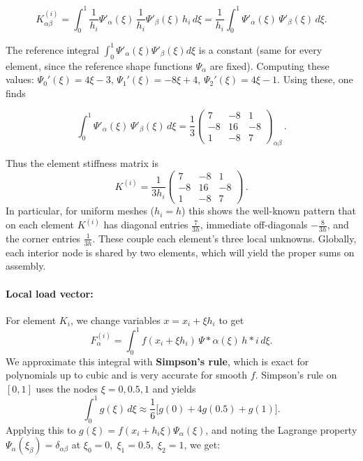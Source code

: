\[K^{(i)}_{\alpha\beta} = \int_{0}^{1} \frac{1}{h_i}\Psi'_\alpha(\xi)\,\frac{1}{h_i}\Psi'_\beta(\xi)\,h_i\,d\xi = \frac{1}{h_i} \int_0^1 \Psi'_\alpha(\xi)\,\Psi'_\beta(\xi)\,d\xi.\]

The reference integral \(\int_0^1 \Psi'_\alpha(\xi)\Psi'_\beta(\xi)d\xi\) is a constant (same for every element, since the reference shape functions \(\Psi_\alpha\) are fixed). Computing these values: \(\Psi_0'(\xi)=4\xi-3\), \(\Psi_1'(\xi)=-8\xi+4\), \(\Psi_2'(\xi)=4\xi-1\).
Using these, one finds

\[
	\int_0^1 \Psi'_\alpha(\xi)\,\Psi'_\beta(\xi)\,d\xi =
	\frac{1}{3}\begin{pmatrix}
		7 & -8 & 1 \\ -8 & 16 & -8 \\ 1 & -8 & 7
	\end{pmatrix}_{\!\alpha\beta}\,.
\]

Thus the element stiffness matrix is
\[
	K^{(i)} = \frac{1}{3 h_i}
	\begin{pmatrix}
		7  & -8 & 1  \\
		-8 & 16 & -8 \\
		1  & -8 & 7
	\end{pmatrix}\,.
\]
In particular, for uniform meshes (\(h_i=h\)) this shows the well-known pattern that on each element \(K^{(i)}\) has diagonal entries \(\frac{7}{3h}\), immediate off-diagonals \(-\frac{8}{3h}\), and the corner entries \(\frac{1}{3h}\).
These couple each element's three local unknowns.
Globally, each interior node is shared by two elements, which will yield the proper sums on assembly.

\paragraph{Local load vector:} For element \(K_i\), we change variables \(x = x_i + \xi h_i\) to get
\[
	F^{(i)}_\alpha = \int_{0}^{1} f(x_i + \xi h_i)\,\Psi*\alpha(\xi)\,h*i\,d\xi.
\]
We approximate this integral with \textbf{Simpson's rule}, which is exact for polynomials up to cubic and is very accurate for smooth \(f\).
Simpson's rule on \([0,1]\) uses the nodes \(\xi=0,0.5,1\) and yields
\[
	\int_{0}^{1} g(\xi)\,d\xi \approx \frac{1}{6}\Big[g(0)+4g(0.5)+g(1)\Big].
\]
Applying this to \(g(\xi)=f(x_i+h_i\xi)\Psi_\alpha(\xi)\), and noting the Lagrange property \(\Psi_\alpha(\xi_{\beta})=\delta_{\alpha\beta}\) at \(\xi_0=0,\;\xi_1=0.5,\;\xi_2=1\), we get:

